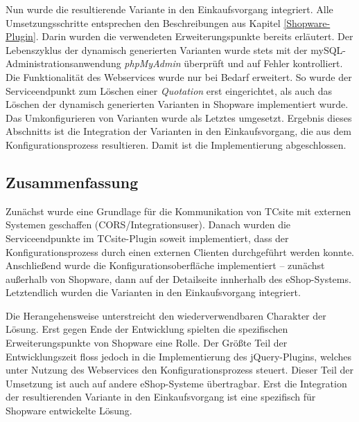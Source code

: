\documentclass[11pt, a4paper, titlepage, listof=totoc, bibliography=totoc, index=totoc, twoside, openright, headings=normal]{scrreprt}
\begin{document}
Nun wurde die resultierende Variante in den Einkaufsvorgang integriert. Alle  Umsetzungsschritte entsprechen den Beschreibungen aus Kapitel \ref{Shopware-Plugin}. Darin wurden die verwendeten Erweiterungspunkte bereits erläutert. Der Lebenszyklus der dynamisch generierten Varianten wurde stets mit der mySQL-Administrationsanwendung \emph{phpMyAdmin} überprüft und auf Fehler kontrolliert. Die Funktionalität des Webservices wurde nur bei Bedarf erweitert. So wurde der Serviceendpunkt zum Löschen einer \emph{Quotation} erst eingerichtet, als auch das Löschen der dynamisch generierten Varianten in Shopware implementiert wurde. Das Umkonfigurieren von Varianten wurde als Letztes umgesetzt. Ergebnis dieses Abschnitts ist die Integration der Varianten in den Einkaufsvorgang, die aus dem Konfigurationsprozess resultieren. Damit ist die Implementierung abgeschlossen.

\subsection*{Zusammenfassung}
Zunächst wurde eine Grundlage für die Kommunikation von TCsite mit externen Systemen geschaffen (CORS/Integrationsuser). Danach wurden die Serviceendpunkte im TCsite-Plugin soweit implementiert, dass der Konfigurationsprozess durch einen externen Clienten durchgeführt werden konnte. Anschließend wurde die Konfigurationsoberfläche implementiert -- zunächst außerhalb von Shopware, dann auf der Detailseite innherhalb des eShop-Systems. Letztendlich wurden die Varianten in den Einkaufsvorgang integriert.

Die Herangehensweise unterstreicht den wiederverwendbaren Charakter der Lösung. Erst gegen Ende der Entwicklung spielten die spezifischen Erweiterungspunkte von Shopware eine Rolle. Der Größte Teil der Entwicklungszeit floss jedoch in die Implementierung des jQuery-Plugins, welches unter Nutzung des Webservices den Konfigurationsprozess steuert. Dieser Teil der Umsetzung ist auch auf andere eShop-Systeme übertragbar. Erst die Integration der resultierenden Variante in den Einkaufsvorgang ist eine spezifisch für Shopware entwickelte Lösung.
\end{document}
